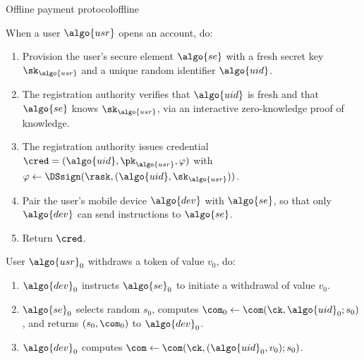 \begin{protocolbox}{Offline payment protocol}{offline}
\begin{description}
\begin{enumerate}
      \end{enumerate}

    \item[$\cred \leftarrow \algo{OpenAccount}(\rask)$ :] When a user
      $\algo{usr}$ opens an account, do:

      \begin{enumerate}

        \item Provision the user's secure element $\algo{se}$ with a fresh
          secret key $\sk_{\algo{usr}}$ and a unique random identifier
          $\algo{uid}$.

        \item The registration authority verifies that $\algo{uid}$ is fresh
          and that $\algo{se}$ knows $\sk_{\algo{usr}}$, via an interactive
          zero-knowledge proof of knowledge.

        \item The registration authority issues credential $\cred =
          (\algo{uid}, \pk_{\algo{usr}}, \varphi)$ with $\varphi \leftarrow
          \DSsign(\rask, (\algo{uid}, \sk_{\algo{usr}}))$.

        \item Pair the user's mobile device $\algo{dev}$ with $\algo{se}$, so
          that only $\algo{dev}$ can send instructions to $\algo{se}$.

        \item Return $\cred$.

      \end{enumerate}

    \item[$T_0 \leftarrow \algo{Withdraw}(v_0)$ :]\label{sec:withdrawal} User
      $\algo{usr}_0$ withdraws a token of value $v_0$, do:

      \begin{enumerate}

        \item $\algo{dev}_0$ instructs $\algo{se}_0$ to initiate a withdrawal
          of value $v_0$.

        \item $\algo{se}_0$ selects random $s_0$, computes $\com_0 \leftarrow
          \com(\ck, \algo{uid}_0; s_0)$, and returns $(s_0, \com_0)$ to
          $\algo{dev}_0$.

        \item $\algo{dev}_0$ computes $\com \leftarrow \com(\ck, (\algo{uid}_0,
          v_0); s_0)$.


\end{enumerate}
\end{description}
\end{protocolbox}
